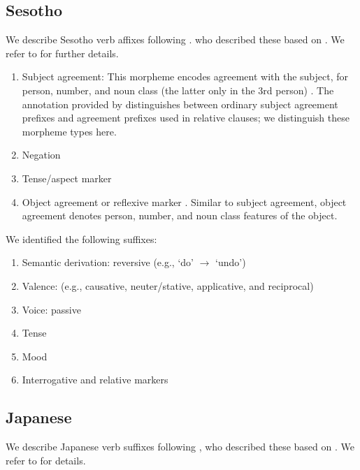 \documentclass[11pt,letterpaper]{article}
\begin{document}
\subsection{Sesotho}

We describe Sesotho verb affixes following \cite{Hahn2020modeling}.
who described these based on \citep{doke1967textbook, guma1971outline, demuth1992acquisition}.
We refer to \cite{Hahn2020modeling} for further details.

\begin{enumerate}
    \item Subject agreement: This morpheme encodes agreement with the subject, for person, number, and noun class (the latter only in the 3rd person) \cite[]{doke1967textbook}.
            The annotation provided by \cite{demuth1992acquisition} distinguishes between ordinary subject agreement prefixes and agreement prefixes used in relative clauses; we distinguish these morpheme types here.

    \item Negation \citep[]{doke1967textbook}

    \item Tense/aspect marker   \citep[--424]{doke1967textbook}

    \item Object agreement or reflexive marker \citep[]{doke1967textbook}.
    Similar to subject agreement, object agreement denotes person, number, and noun class features of the object.
\end{enumerate}
We identified the following suffixes:

\begin{enumerate}
\item Semantic derivation: reversive (e.g., `do' $\rightarrow$ `undo')
\item Valence: (e.g., causative, neuter/stative, applicative, and reciprocal)
    \item Voice: passive
    \item Tense
    \item Mood
    \item Interrogative and relative markers
\end{enumerate}

\subsection{Japanese}

We describe Japanese verb suffixes following \citep{Hahn2020modeling}, who described these based on \citep{kaiser2013japanese,hasegawa2014japanese}.
We refer to \citep{Hahn2020modeling} for details.
\end{document}
